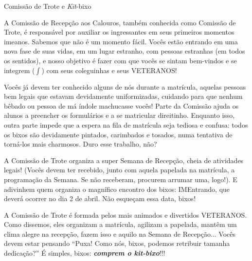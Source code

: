 \begin{secao}{Comissão de Trote e \textit{Kit}-bixo}

A Comissão de Recepção aos Calouros, também conhecida como Comissão de Trote, é
responsável por auxiliar os ingressantes em seus primeiros momentos imeanos.
Sabemos que não é um momento fácil. Vocês estão entrando em uma nova fase de
suas vidas, em um lugar estranho, com pessoas estranhas (em todos os sentidos),
e nosso objetivo é fazer com que vocês se sintam bem-vindos e se integrem
($\int$) com seus coleguinhas e seus VETERANOS!

Vocês já devem ter conhecido alguns de nós durante a matrícula, aquelas pessoas
bem legais que estavam devidamente uniformizadas, cuidando para que nenhum
bêbado ou pessoa de má índole machucasse vocês! Parte da Comissão ajuda os
alunos a preencher os formulários e a se matricular direitinho. Enquanto isso,
outra parte impede que a espera na fila de matrícula seja tediosa e confusa:
todos os bixos são devidamente pintados, carimbados e tosados, numa tentativa
de torná-los mais charmosos. Duro esse trabalho, não?

A Comissão de Trote organiza a super Semana de Recepção, cheia de atividades
legais! (Vocês devem ter recebido, junto com aquela papelada na matrícula, a
programação da Semana. Se não receberam, procurem arrumar uma, logo!).
E adivinhem quem organiza o magnífico encontro dos bixos: IMEntrando, que deverá
ocorrer no dia 2 de abril. Não esqueçam essa data, bixos! %

A Comissão de Trote é formada pelos mais animados e divertidos VETERANOS. Como
dissemos, eles organizam a matrícula, agilizam a papelada, mantêm um clima
alegre na recepção, fazem isso e aquilo na Semana de Recepção...
Vocês devem estar pensando ``Puxa! Como nós, bixos, podemos retribuir
tamanha dedicação?'' É simples, bixos: {\bf\em comprem o \textit{kit}-bixo}!!!


\end{secao}
